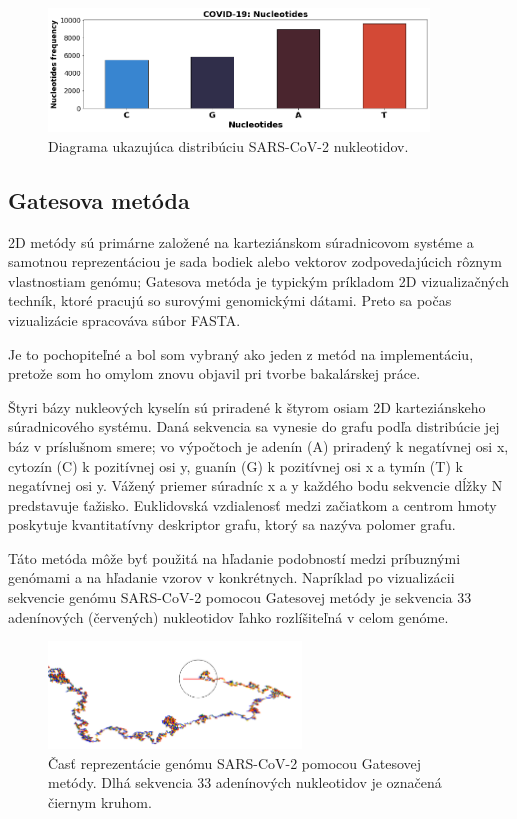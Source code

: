 \begin{figure}[!ht]
	\centering
	\includegraphics[width=0.9\textwidth]{figures/covidnucleotides.png}
	\caption{Diagrama ukazujúca distribúciu SARS-CoV-2 nukleotidov.\label{o:latex_friendly_zone}}
\end{figure}

\subsection{Gatesova metóda}
2D metódy sú primárne založené na karteziánskom súradnicovom systéme a samotnou reprezentáciou je sada bodiek alebo vektorov zodpovedajúcich rôznym vlastnostiam genómu;
Gatesova metóda je typickým príkladom 2D vizualizačných techník, ktoré pracujú so surovými genomickými dátami.
Preto sa počas vizualizácie spracováva súbor FASTA.

Je to pochopiteľné a bol som vybraný ako jeden z metód na implementáciu, pretože som ho omylom znovu objavil pri tvorbe bakalárskej práce.

Štyri bázy nukleových kyselín sú priradené k štyrom osiam 2D karteziánskeho súradnicového systému.
Daná sekvencia sa vynesie do grafu podľa distribúcie jej báz v príslušnom smere;
vo výpočtoch je adenín (A) priradený k negatívnej osi x, cytozín (C) k pozitívnej osi y, guanín (G) k pozitívnej osi x a tymín (T) k negatívnej osi y.
Vážený priemer súradníc x a y každého bodu sekvencie dĺžky N predstavuje ťažisko.
Euklidovská vzdialenosť medzi začiatkom a centrom hmoty poskytuje kvantitatívny deskriptor grafu, ktorý sa nazýva polomer grafu.

Táto metóda môže byť použitá na hľadanie podobností medzi príbuznými genómami a na hľadanie vzorov v konkrétnych.
Napríklad po vizualizácii sekvencie genómu SARS-CoV-2 pomocou Gatesovej metódy je sekvencia 33 adenínových (červených) nukleotidov ľahko rozlíšiteľná v celom genóme.
\begin{figure}[!ht]
	\centering
	\includegraphics[width=0.6\textwidth]{figures/aaaaa.png}
	\caption{Časť reprezentácie genómu SARS-CoV-2 pomocou Gatesovej metódy. Dlhá sekvencia 33 adenínových nukleotidov je označená čiernym kruhom.\label{o:latex_friendly_zone}}
\end{figure}

